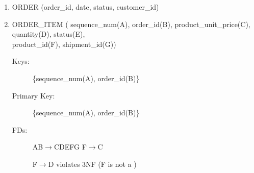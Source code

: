 \documentclass[12pt]{article}
\begin{document}
\begin{enumerate}
\item ORDER (order\_id, date, status, customer\_id)   
\newpage
\item ORDER\_ITEM ( sequence\_num(A), order\_id(B), product\_unit\_price(C), quantity(D), status(E),
                    \\product\_id(F), shipment\_id(G)) 
\begin{description}
    \item[Keys:] \{sequence\_num(A), order\_id(B)\}
    \item[Primary Key:] \{sequence\_num(A), order\_id(B)\}
    \item[FDs:]  AB$\rightarrow$CDEFG \quad F$\rightarrow$C
    \item[] F$\rightarrow$D violates 3NF (F is not a ) 
\end{description}
   



\end{enumerate}
\end{document}
